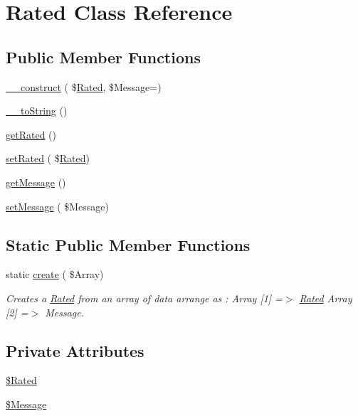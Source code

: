 \hypertarget{class_rated}{}\section{Rated Class Reference}
\label{class_rated}
\subsection*{Public Member Functions}
\begin{DoxyCompactItemize}
\item 
\hyperlink{class_rated_a4b9d06c250a48312c7bf82f46c0193b4}{\+\_\+\+\_\+construct} ( \$\hyperlink{class_rated}{Rated}, \$Message=\textquotesingle{}\textquotesingle{})
\item 
\hyperlink{class_rated_ac2d6c9d9caa4d778cbdf6bb56cdadd52}{\+\_\+\+\_\+to\+String} ()
\item 
\hyperlink{class_rated_a9c4a34001e20782332eec732ef91201c}{get\+Rated} ()
\item 
\hyperlink{class_rated_a80c3a8fe3bc7d57891509100c1199c6f}{set\+Rated} ( \$\hyperlink{class_rated}{Rated})
\item 
\hyperlink{class_rated_a423269207aab7311214b89e2abe5acae}{get\+Message} ()
\item 
\hyperlink{class_rated_a7f3cd6e9f485ad6f1a34afdca362f8e4}{set\+Message} ( \$Message)
\end{DoxyCompactItemize}
\subsection*{Static Public Member Functions}
\begin{DoxyCompactItemize}
\item 
static \hyperlink{class_rated_a752da492a12860ffd5dc9d9e63a252e4}{create} ( \$Array)
\begin{DoxyCompactList}\small\item\em Creates a \hyperlink{class_rated}{Rated} from an array of data arrange as \+: Array \mbox{[}1\mbox{]} =$>$ \hyperlink{class_rated}{Rated} Array \mbox{[}2\mbox{]} =$>$ Message. \end{DoxyCompactList}\end{DoxyCompactItemize}
\subsection*{Private Attributes}
\begin{DoxyCompactItemize}
\item 
\hyperlink{class_rated_af555a3fb7d02d47a336ac857a35d3b49}{\$\+Rated}
\item 
\hyperlink{class_rated_a07d166a536dd688f4c838db3b76258fc}{\$\+Message}
\end{DoxyCompactItemize}



